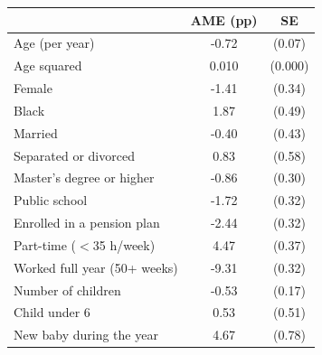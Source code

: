 \begin{tabular}{lcc}
\toprule
 & AME (pp) & SE \\
\midrule
Age (per year) & -0.72 & (0.07) \\
Age squared & 0.010 & (0.000) \\
Female & -1.41 & (0.34) \\
Black & 1.87 & (0.49) \\
Married & -0.40 & (0.43) \\
Separated or divorced & 0.83 & (0.58) \\
Master's degree or higher & -0.86 & (0.30) \\
Public school & -1.72 & (0.32) \\
Enrolled in a pension plan & -2.44 & (0.32) \\
Part-time ($<$35 h/week) & 4.47 & (0.37) \\
Worked full year (50+ weeks) & -9.31 & (0.32) \\
Number of children & -0.53 & (0.17) \\
Child under 6 & 0.53 & (0.51) \\
New baby during the year & 4.67 & (0.78) \\
\bottomrule
\end{tabular}
